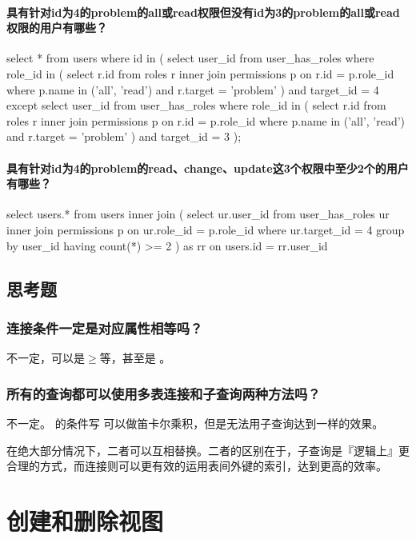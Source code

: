 \documentclass{ctexrep}
\begin{document}
\subsubsection*{具有针对id为4的problem的all或read权限但没有id为3的problem的all或read权限的用户有哪些？}
\begin{run}
    select * from users where id in (
        select user_id from user_has_roles where role_id in (
            select r.id from roles r 
            inner join permissions p on r.id = p.role_id 
            where p.name in ('all', 'read') and r.target = 'problem'
        ) and target_id = 4
        except
        select user_id from user_has_roles where role_id in (
            select r.id from roles r 
            inner join permissions p on r.id = p.role_id 
            where p.name in ('all', 'read') and r.target = 'problem'
        ) and target_id = 3
    );
\end{run}
\subsubsection*{具有针对id为4的problem的read、change、update这3个权限中至少2个的用户有哪些？}
\begin{run}
    select users.* from users inner join (
        select ur.user_id from user_has_roles ur
        inner join permissions p on ur.role_id = p.role_id
        where ur.target_id = 4 group by user_id having count(*) >= 2
    ) as rr on users.id = rr.user_id
\end{run}
\section{思考题}
\subsection*{连接条件一定是对应属性相等吗？}
不一定，可以是$\ge$等，甚至是 。
\subsection*{所有的查询都可以使用多表连接和子查询两种方法吗？}
不一定。 的条件写  可以做笛卡尔乘积，但是无法用子查询达到一样的效果。

在绝大部分情况下，二者可以互相替换。二者的区别在于，子查询是『逻辑上』更合理的方式，而连接则可以更有效的运用表间外键的索引，达到更高的效率。

\chapter{创建和删除视图}
\end{document}
